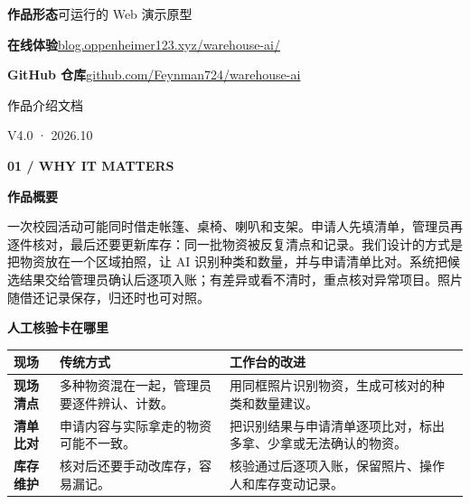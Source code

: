 \documentclass[UTF8,fontset=none,11pt,a4paper]{ctexart}
\newcommand{\eyebrow}[1]{{\small\bfseries\color{forest}#1}}
\newcommand{\pageheading}[2]{\eyebrow{#1}\par\vspace{2mm}{\fontsize{23}{29}\selectfont\bfseries #2}\par\vspace{3mm}{\color{gold}\rule{24mm}{1.4pt}}\par\vspace{5mm}}
\newcommand{\smalllabel}[1]{{\footnotesize\bfseries\color{forest}#1}}
\begin{document}
\vfill
\begin{minipage}{0.69\linewidth}
{\small\bfseries 作品形态}\quad 可运行的 Web 演示原型\par\vspace{1mm}
{\small\bfseries 在线体验}\quad\href{https://blog.oppenheimer123.xyz/warehouse-ai/}{blog.oppenheimer123.xyz/warehouse-ai/}
\par\vspace{1mm}
{\small\bfseries GitHub 仓库}\quad\href{https://github.com/Feynman724/warehouse-ai}{github.com/Feynman724/warehouse-ai}
\end{minipage}\hfill
\begin{minipage}{0.28\linewidth}\raggedleft
{\footnotesize\color{slate}作品介绍文档\par V4.0 · 2026.10}
\end{minipage}

\newpage
\pageheading{01 / WHY IT MATTERS}{让照片承担借出核验}
\begin{greenbox}
\smalllabel{作品概要}\par\vspace{2mm}
一次校园活动可能同时借走帐篷、桌椅、喇叭和支架。申请人先填清单，管理员再逐件核对，最后还要更新库存：同一批物资被反复清点和记录。我们设计的方式是把物资放在一个区域拍照，让 AI 识别种类和数量，并与申请清单比对。系统把候选结果交给管理员确认后逐项入账；有差异或看不清时，重点核对异常项目。照片随借还记录保存，归还时也可对照。
\end{greenbox}

\vspace{6mm}
\smalllabel{人工核验卡在哪里}\par\vspace{3mm}
\begin{tabularx}{\linewidth}{@{}>{\bfseries}p{27mm}X X@{}}
\color{forest}现场 & \color{forest}\bfseries 传统方式 & \color{forest}\bfseries 工作台的改进\\\hline
现场清点 & 多种物资混在一起，管理员要逐件辨认、计数。 & 用同框照片识别物资，生成可核对的种类和数量建议。\\
清单比对 & 申请内容与实际拿走的物资可能不一致。 & 把识别结果与申请清单逐项比对，标出多拿、少拿或无法确认的物资。\\
库存维护 & 核对后还要手动改库存，容易漏记。 & 核验通过后逐项入账，保留照片、操作人和库存变动记录。\\
\end{tabularx}
\end{document}
